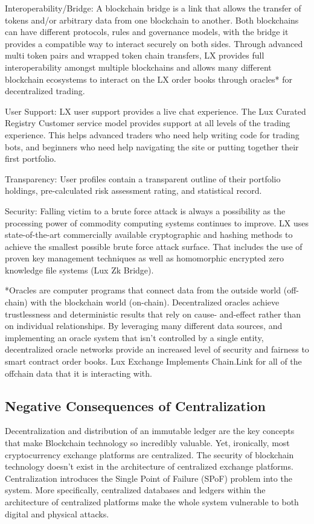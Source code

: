 \documentclass[11pt]{article}
\begin{document}
Interoperability/Bridge: A blockchain bridge is a link that allows the transfer of tokens and/or arbitrary data from one blockchain to another. Both blockchains can have different protocols, rules and governance models, with the bridge it provides a compatible way to interact securely on both sides. Through advanced multi token pairs and wrapped token chain transfers, LX provides full interoperability amongst multiple blockchains and allows many different blockchain ecosystems to interact on the LX order books through oracles* for decentralized trading.


User Support: LX user support provides a live chat experience. The Lux Curated Registry Customer service model provides support at all levels of the trading experience. This helps advanced traders who need help writing code for trading bots, and beginners who need help navigating the site or putting together their first portfolio.


Transparency: User profiles contain a transparent outline of their portfolio holdings, pre-calculated risk assessment rating, and statistical record.


Security: Falling victim to a brute force attack is always a possibility as the processing power of commodity computing systems continues to improve. LX uses state-of-the-art commercially available cryptographic and hashing methods to achieve the smallest possible brute force attack surface. That includes the use of proven key management techniques as well as homomorphic encrypted zero knowledge file systems (Lux Zk Bridge).


*Oracles are computer programs that connect data from the outside world (off-chain) with the blockchain world (on-chain). Decentralized oracles achieve trustlessness and deterministic results that rely on cause- and-effect rather than on individual relationships. By leveraging many different data sources, and implementing an oracle system that isn't controlled by a single entity, decentralized oracle networks provide an increased level of security and fairness to smart contract order books. Lux Exchange Implements Chain.Link for all of the offchain data that it is interacting with.


\subsection{Negative Consequences of Centralization}

Decentralization and distribution of an immutable ledger are the key concepts that make Blockchain technology so incredibly valuable. Yet, ironically, most cryptocurrency exchange platforms are centralized. The security of blockchain technology doesn't exist in the architecture of centralized exchange platforms. Centralization introduces the Single Point of Failure (SPoF) problem into the system. More specifically, centralized databases and ledgers within the architecture of centralized platforms make the whole system vulnerable to both digital and physical attacks.
\end{document}
